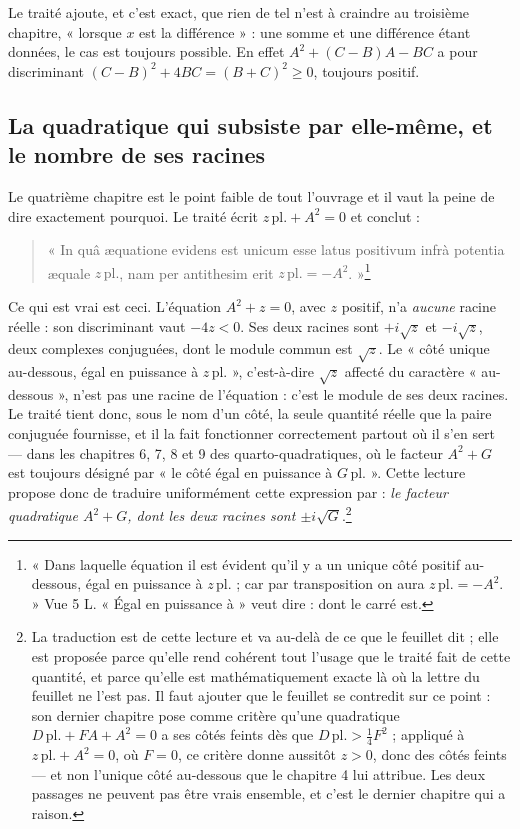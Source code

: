 \documentclass[11pt,a4paper]{article}
\begin{document}
Le traité ajoute, et c'est exact, que rien de tel n'est à craindre au troisième
chapitre, « lorsque $x$ est la différence » : une somme et une différence étant
données, le cas est toujours possible. En effet $A^2 + (C-B)A - BC$ a pour
discriminant $(C-B)^2 + 4BC = (B+C)^2 \ge 0$, toujours positif.

\subsection*{La quadratique qui subsiste par elle-même, et le nombre de ses racines}

Le quatrième chapitre est le point faible de tout l'ouvrage et il vaut la peine
de dire exactement pourquoi. Le traité écrit $z\,\mathrm{pl.} + A^2 = 0$ et
conclut :

\begin{quote}
« In quâ æquatione evidens est unicum esse latus positivum infrà potentia æquale
$z\,\mathrm{pl.}$, nam per antithesim erit $z\,\mathrm{pl.} = -A^2$. »\footnote{« Dans
laquelle équation il est évident qu'il y a un unique côté positif au-dessous,
égal en puissance à $z\,\mathrm{pl.}$ ; car par transposition on aura
$z\,\mathrm{pl.} = -A^2$. » Vue 5 L. « Égal en puissance à » veut dire : dont le
carré est.}
\end{quote}

Ce qui est vrai est ceci. L'équation $A^2 + z = 0$, avec $z$ positif, n'a
\emph{aucune} racine réelle : son discriminant vaut $-4z < 0$. Ses deux racines
sont $+i\sqrt{z}$ et $-i\sqrt{z}$, deux complexes conjuguées, dont le module
commun est $\sqrt{z}$. Le « côté unique au-dessous, égal en puissance à
$z\,\mathrm{pl.}$ », c'est-à-dire $\sqrt{z}$ affecté du caractère
« au-dessous », n'est pas une racine de l'équation : c'est le module de ses deux
racines. Le traité tient donc, sous le nom d'un côté, la seule quantité réelle
que la paire conjuguée fournisse, et il la fait fonctionner correctement partout
où il s'en sert — dans les chapitres 6, 7, 8 et 9 des quarto-quadratiques, où le
facteur $A^2 + G$ est toujours désigné par « le côté égal en puissance à
$G\,\mathrm{pl.}$ ». Cette lecture propose donc de traduire uniformément cette
expression par : \emph{le facteur quadratique $A^2 + G$, dont les deux racines
sont $\pm i\sqrt{G}$}.\footnote{La traduction est de cette lecture et va au-delà
de ce que le feuillet dit ; elle est proposée parce qu'elle rend cohérent tout
l'usage que le traité fait de cette quantité, et parce qu'elle est
mathématiquement exacte là où la lettre du feuillet ne l'est pas. Il faut
ajouter que le feuillet se contredit sur ce point : son dernier chapitre pose
comme critère qu'une quadratique $D\,\mathrm{pl.} + FA + A^2 = 0$ a ses côtés
feints dès que $D\,\mathrm{pl.} > \tfrac14 F^2$ ; appliqué à
$z\,\mathrm{pl.} + A^2 = 0$, où $F = 0$, ce critère donne aussitôt $z > 0$, donc
des côtés feints — et non l'unique côté au-dessous que le chapitre 4 lui
attribue. Les deux passages ne peuvent pas être vrais ensemble, et c'est le
dernier chapitre qui a raison.}
\end{document}
